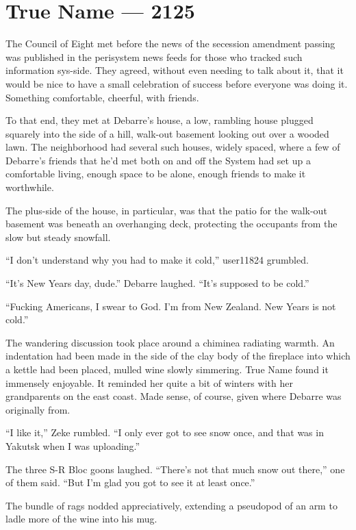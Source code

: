 \hypertarget{true-name-2125}{%
\chapter{True Name — 2125}\label{true-name-2125}}

The Council of Eight met before the news of the secession amendment passing was published in the perisystem news feeds for those who tracked such information sys-side. They agreed, without even needing to talk about it, that it would be nice to have a small celebration of success before everyone was doing it. Something comfortable, cheerful, with friends.

To that end, they met at Debarre's house, a low, rambling house plugged squarely into the side of a hill, walk-out basement looking out over a wooded lawn. The neighborhood had several such houses, widely spaced, where a few of Debarre's friends that he'd met both on and off the System had set up a comfortable living, enough space to be alone, enough friends to make it worthwhile.

The plus-side of the house, in particular, was that the patio for the walk-out basement was beneath an overhanging deck, protecting the occupants from the slow but steady snowfall.

``I don't understand why you had to make it cold,'' user11824 grumbled.

``It's New Years day, dude.'' Debarre laughed. ``It's supposed to be cold.''

``Fucking Americans, I swear to God. I'm from New Zealand. New Years is not cold.''

The wandering discussion took place around a chiminea radiating warmth. An indentation had been made in the side of the clay body of the fireplace into which a kettle had been placed, mulled wine slowly simmering. True Name found it immensely enjoyable. It reminded her quite a bit of winters with her grandparents on the east coast. Made sense, of course, given where Debarre was originally from.

``I like it,'' Zeke rumbled. ``I only ever got to see snow once, and that was in Yakutsk when I was uploading.''

The three S-R Bloc goons laughed. ``There's not that much snow out there,'' one of them said. ``But I'm glad you got to see it at least once.''

The bundle of rags nodded appreciatively, extending a pseudopod of an arm to ladle more of the wine into his mug.

